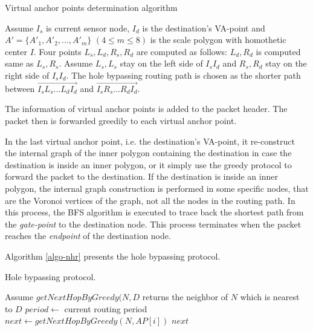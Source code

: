\begin{algorithm}[!htb]
\SetAlgoLined
\caption{Virtual anchor points determination algorithm}
\label{algo-nhr-vap}
\nosemic Assume $I_s$ is current sensor node, $I_d$ is the destination's VA-point and $A' = \{A'_1, A'_2, ..., A'_m\}$ $(4 \leq m \leq 8)$ is the scale polygon with homothetic center $I$.\;
\nosemic Four points $L_s, L_d, R_s, R_d$ are computed as follows:\;
\nosemic $L_d, R_d$ is computed same as $L_s, R_s$.\;
\nosemic Assume $L_s, L_s$ stay on the left side of $I_sI_d$ and $R_s, R_d$ stay on the right side of $I_sI_d$. The hole bypassing routing path is chosen as the shorter path between $\overrightarrow{I_sL_s...L_dI_d}$ and $\overrightarrow{I_sR_s...R_dI_d}$.
\end{algorithm}
The information of virtual anchor points is added to the packet header. The packet then is forwarded greedily to each virtual anchor point. 

In the last virtual anchor point, i.e. the destination's VA-point, it re-construct the internal graph of the inner polygon containing the destination in case the destination is inside an inner polygon, or it simply use the greedy protocol to forward the packet to the destination. If the destination is inside an inner polygon, the internal graph construction is performed in some specific nodes, that are the Voronoi vertices of the graph, not all the nodes in the routing path. In this process, the BFS algorithm is executed to trace back the shortest path from the \emph{gate-point} to the destination node. This process terminates when the packet reaches the \emph{endpoint} of the destination node.

Algorithm \ref{algo-nhr} presents the hole bypassing protocol.

\begin{algorithm}[!htb]
\SetAlgoLined
\caption{Hole bypassing protocol.}
\label{algo-nhr}
Assume $getNextHopByGreedy(N, D$ returns the neighbor of $N$ which is nearest to $D$\;
$period \leftarrow$ current routing period\;
$next \leftarrow getNextHopByGreedy(N, AP[i])$\;
\Return $next$\;
\end{algorithm}

